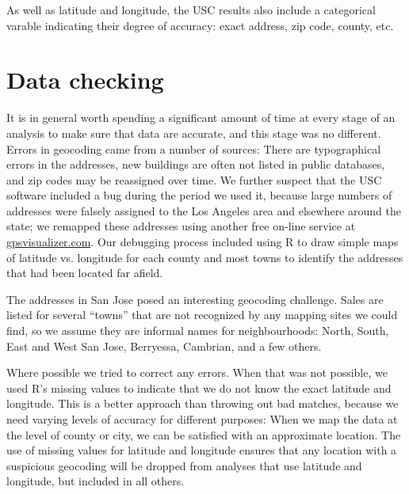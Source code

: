 \documentclass[oneside]{article}
\begin{document}
As well as latitude and longitude, the USC results also include a categorical varable indicating their degree of accuracy: exact address, zip code, county, etc.



\section{Data checking}

It is in general worth spending a significant amount of time at every stage of an analysis to make sure that data are accurate, and this stage was no different.  Errors in geocoding came from a number of sources:  There are typographical errors in the addresses, new buildings are often not listed in public databases, and zip codes may be reassigned over time.  We further suspect that the USC software included a bug during the period we used it, because large numbers of addresses were falsely assigned to the Los Angeles area and elsewhere around the state; we remapped these addresses using another free on-line service at \url{gpsvisualizer.com}. Our debugging process included using R to draw simple maps of latitude vs. longitude for each county and most towns to identify the addresses that had been located far afield.

The addresses in San Jose posed an interesting geocoding challenge.  Sales are listed for several ``towns'' that are not recognized by any mapping sites we could find, so we assume they are informal names for neighbourhoods: North, South, East and West San Jose, Berryessa, Cambrian, and a few others.  


Where possible we tried to correct any errors.  When that was not possible, we used R's missing values to indicate that we do not know the exact latitude and longitude.  This is a better approach than throwing out bad matches, because we need varying levels of accuracy for different  purposes: When we map the data at the level of county or city, we can be satisfied with an approximate location.  The use of missing values for latitude and longitude ensures that any location with a suspicious geocoding will be dropped from analyses that use latitude and longitude, but included in all others.
\end{document}
